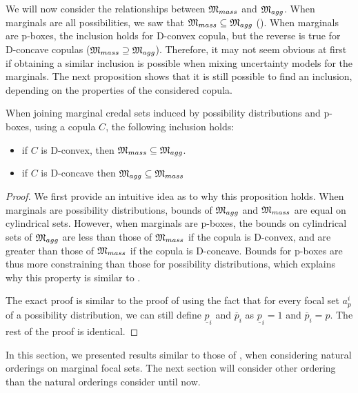 We will now consider the relationships between $\mathfrak{M}_{mass}$ and $\mathfrak{M}_{agg}$. When marginals are all possibilities, we saw that $\mathfrak{M}_{mass}\subseteq\mathfrak{M}_{agg}$ (). When marginals are p-boxes, the inclusion holds for D-convex copula, but the reverse is true for D-concave copulas (\ie $\mathfrak{M}_{mass}\supseteq\mathfrak{M}_{agg}$). Therefore, it may not seem obvious at first if obtaining a similar inclusion is possible when mixing uncertainty models for the marginals. The next proposition shows that it is still possible to find an inclusion, depending on the properties of the considered copula.
\begin{proposition}
    When joining marginal credal sets induced by possibility distributions and p-boxes, using a copula $C$, the following inclusion holds:
    \begin{itemize}
        \item if $C$ is D-convex, then $\mathfrak{M}_{mass}\subseteq \mathfrak{M}_{agg}$.
        \item if $C$ is D-concave then $\mathfrak{M}_{agg}\subseteq\mathfrak{M}_{mass}$ 
    \end{itemize}
\end{proposition}

\begin{proof}
    We first provide an intuitive idea as to why this proposition holds. When marginals are possibility distributions, bounds of $\mathfrak{M}_{agg}$ and $\mathfrak{M}_{mass}$ are equal on cylindrical sets. However, when marginals are p-boxes, the bounds on cylindrical sets of $\mathfrak{M}_{agg}$ are less than those of $\mathfrak{M}_{mass}$ if the copula is D-convex, and are greater than those of $\mathfrak{M}_{mass}$ if the copula is D-concave. Bounds for p-boxes are thus more constraining than those for possibility distributions, which explains why this property is similar to .
    
    The exact proof is similar to the proof of  using the fact that for every focal set $a^i_p$ of a possibility distribution, we can still define $\underline{p}_i$ and $\overline{p}_i$ as $\underline{p}_i=1$ and $\overline{p}_i=p$. The rest of the proof is identical.
\end{proof}

In this section, we presented results similar to those of , when considering natural orderings on marginal focal sets. The next section will consider other ordering than the natural orderings consider until now.

